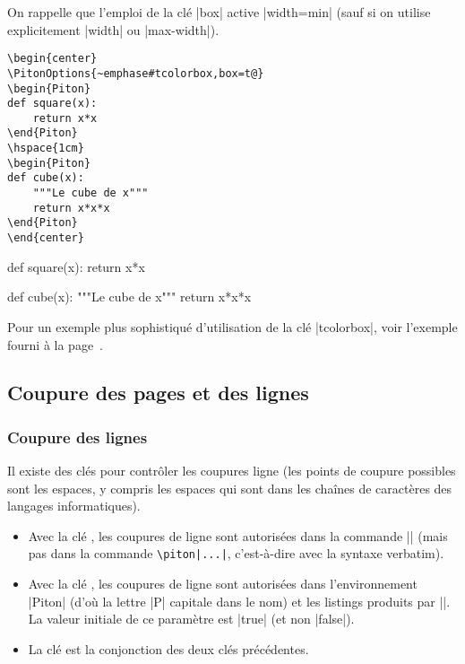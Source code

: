 \documentclass[dvipsnames,svgnames]{article}
\begin{document}
On rappelle que l'emploi de la clé |box| active |width=min| (sauf si on utilise
explicitement |width| ou |max-width|).

\smallskip
\begin{Verbatim}
\begin{center}
\PitonOptions{~emphase#tcolorbox,box=t@}
\begin{Piton}
def square(x):
    return x*x
\end{Piton}
\hspace{1cm}
\begin{Piton}
def cube(x):
    """Le cube de x"""
    return x*x*x
\end{Piton}
\end{center}
\end{Verbatim}

\begin{center}
%
\begin{Piton}
def square(x):
    return x*x
\end{Piton}
\hspace{1cm}
\begin{Piton}
def cube(x):
    """Le cube de x"""
    return x*x*x
\end{Piton}
\end{center}

\bigskip
Pour  un exemple plus sophistiqué d'utilisation de la clé |tcolorbox|, voir l'exemple fourni
à la page~\pageref{examples-tcolorbox}.




\subsection{Coupure des pages et des lignes}

\label{breakable}

\subsubsection{Coupure des lignes}

\label{line-breaks}

Il existe des clés pour contrôler les coupures ligne (les points de coupure
possibles sont les espaces, y compris les espaces qui sont dans les chaînes de
caractères des langages informatiques).
\begin{itemize}
\item {} Avec la clé
, les coupures de ligne sont autorisées dans la commande
|| (mais pas dans la commande \verb+\piton|...|+, c'est-à-dire avec la syntaxe
verbatim).

\item {} Avec la clé
, les coupures de ligne sont autorisées dans
l'environnement |{Piton}| (d'où la lettre |P| capitale dans le nom) et les
listings produits par |\PitonInputFile|. La valeur initiale de ce paramètre est
|true| (et non |false|).

\item {} La clé  est la conjonction des deux clés
précédentes.
\end{itemize}
\end{document}
